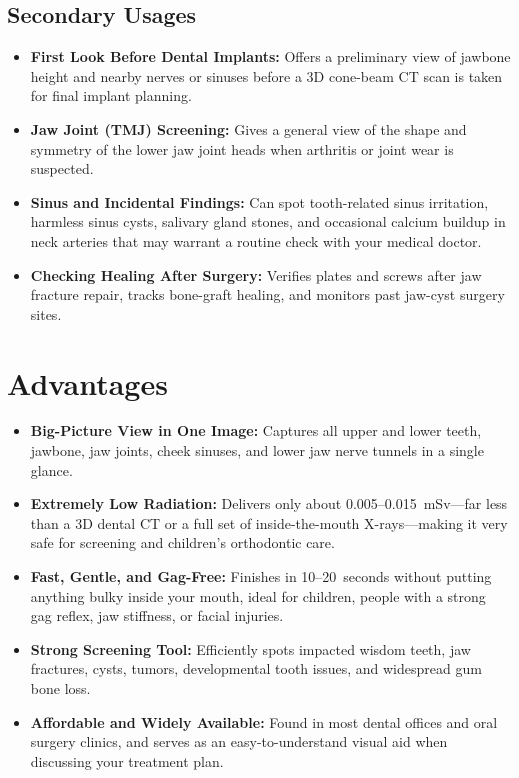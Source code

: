 \subsection{Secondary Usages}
\begin{itemize}
\item \textbf{First Look Before Dental Implants:} Offers a preliminary view of jawbone height and nearby nerves or sinuses before a 3D cone-beam CT scan is taken for final implant planning.
\item \textbf{Jaw Joint (TMJ) Screening:} Gives a general view of the shape and symmetry of the lower jaw joint heads when arthritis or joint wear is suspected.
\item \textbf{Sinus and Incidental Findings:} Can spot tooth-related sinus irritation, harmless sinus cysts, salivary gland stones, and occasional calcium buildup in neck arteries that may warrant a routine check with your medical doctor.
\item \textbf{Checking Healing After Surgery:} Verifies plates and screws after jaw fracture repair, tracks bone-graft healing, and monitors past jaw-cyst surgery sites.
\end{itemize}

\section{Advantages}
\begin{itemize}
\item \textbf{Big-Picture View in One Image:} Captures all upper and lower teeth, jawbone, jaw joints, cheek sinuses, and lower jaw nerve tunnels in a single glance.
\item \textbf{Extremely Low Radiation:} Delivers only about 0.005--0.015~mSv---far less than a 3D dental CT or a full set of inside-the-mouth X-rays---making it very safe for screening and children's orthodontic care.
\item \textbf{Fast, Gentle, and Gag-Free:} Finishes in 10--20~seconds without putting anything bulky inside your mouth, ideal for children, people with a strong gag reflex, jaw stiffness, or facial injuries.
\item \textbf{Strong Screening Tool:} Efficiently spots impacted wisdom teeth, jaw fractures, cysts, tumors, developmental tooth issues, and widespread gum bone loss.
\item \textbf{Affordable and Widely Available:} Found in most dental offices and oral surgery clinics, and serves as an easy-to-understand visual aid when discussing your treatment plan.
\end{itemize}

